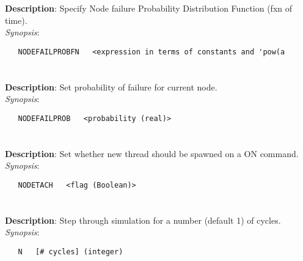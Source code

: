 \section{\quad{}}
\label{manpages:NODEFAILPROBFN}
\label{manpages:nodefailprobfn}
\vspace{-0.1in}
{\bf Description}: 	Specify Node failure Probability Distribution Function (fxn of time).\\[1.5ex]
{\em Synopsis}:
\vspace{-0.05in}
\scriptsize
\begin{lstlisting}
   NODEFAILPROBFN   <expression in terms of constants and 'pow(a
\end{lstlisting}
\normalsize
\vspace{-0.05in}


\section{\quad{}}
\label{manpages:NODEFAILPROB}
\label{manpages:nodefailprob}
\vspace{-0.1in}
{\bf Description}: 	Set probability of failure for current node.\\[1.5ex]
{\em Synopsis}:
\vspace{-0.05in}
\scriptsize
\begin{lstlisting}
   NODEFAILPROB   <probability (real)>																	
\end{lstlisting}
\normalsize
\vspace{-0.05in}


\section{\quad{}}
\label{manpages:NODETACH}
\label{manpages:nodetach}
\vspace{-0.1in}
{\bf Description}: 	Set whether new thread should be spawned on a ON command.\\[1.5ex]
{\em Synopsis}:
\vspace{-0.05in}
\scriptsize
\begin{lstlisting}
   NODETACH   <flag (Boolean)>					
\end{lstlisting}
\normalsize
\vspace{-0.05in}


\section{\quad{}}
\label{manpages:N}
\label{manpages:n}
\vspace{-0.1in}
{\bf Description}: 	Step through simulation for a number (default 1) of cycles.\\[1.5ex]
{\em Synopsis}:
\vspace{-0.05in}
\scriptsize
\begin{lstlisting}
   N   [# cycles] (integer)				
\end{lstlisting}
\normalsize
\vspace{-0.05in}


